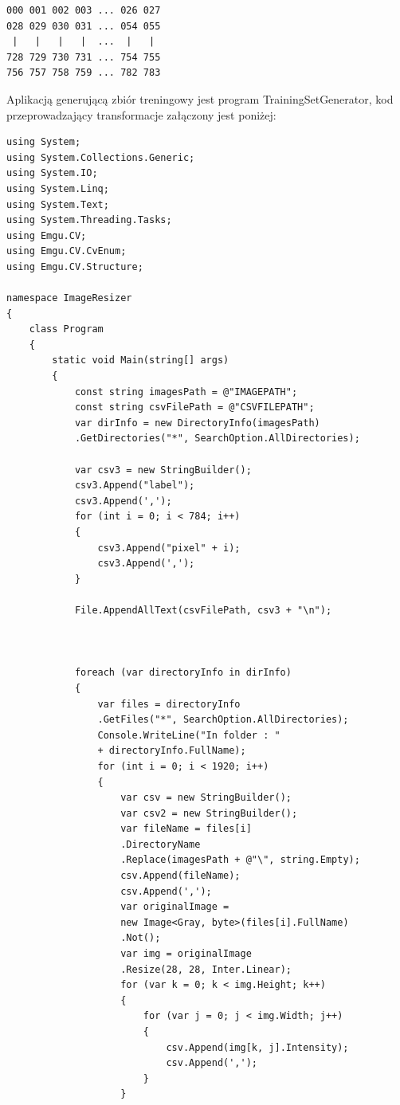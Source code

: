 \documentclass[brudnopis]{xmgr}
\begin{document}
\begin{lstlisting}
000 001 002 003 ... 026 027
028 029 030 031 ... 054 055
 |   |   |   |  ...  |   |
728 729 730 731 ... 754 755
756 757 758 759 ... 782 783 
\end{lstlisting} 

Aplikacją generującą zbiór treningowy jest program TrainingSetGenerator, kod przeprowadzający transformacje załączony jest poniżej:

\begin{lstlisting}
using System;
using System.Collections.Generic;
using System.IO;
using System.Linq;
using System.Text;
using System.Threading.Tasks;
using Emgu.CV;
using Emgu.CV.CvEnum;
using Emgu.CV.Structure;

namespace ImageResizer
{
    class Program
    {
        static void Main(string[] args)
        {
            const string imagesPath = @"IMAGEPATH";
            const string csvFilePath = @"CSVFILEPATH";
            var dirInfo = new DirectoryInfo(imagesPath)
            .GetDirectories("*", SearchOption.AllDirectories);

            var csv3 = new StringBuilder();
            csv3.Append("label");
            csv3.Append(',');
            for (int i = 0; i < 784; i++)
            {
                csv3.Append("pixel" + i);
                csv3.Append(',');
            }

            File.AppendAllText(csvFilePath, csv3 + "\n");



            foreach (var directoryInfo in dirInfo)
            {
                var files = directoryInfo
                .GetFiles("*", SearchOption.AllDirectories);
                Console.WriteLine("In folder : " 
                + directoryInfo.FullName);
                for (int i = 0; i < 1920; i++)
                {
                    var csv = new StringBuilder();
                    var csv2 = new StringBuilder();
                    var fileName = files[i]
                    .DirectoryName
                    .Replace(imagesPath + @"\", string.Empty);
                    csv.Append(fileName);
                    csv.Append(',');
                    var originalImage = 
                    new Image<Gray, byte>(files[i].FullName)
                    .Not();
                    var img = originalImage
                    .Resize(28, 28, Inter.Linear);
                    for (var k = 0; k < img.Height; k++)
                    {
                        for (var j = 0; j < img.Width; j++)
                        {
                            csv.Append(img[k, j].Intensity);
                            csv.Append(',');
                        }
                    }


\end{lstlisting}
\end{document}
